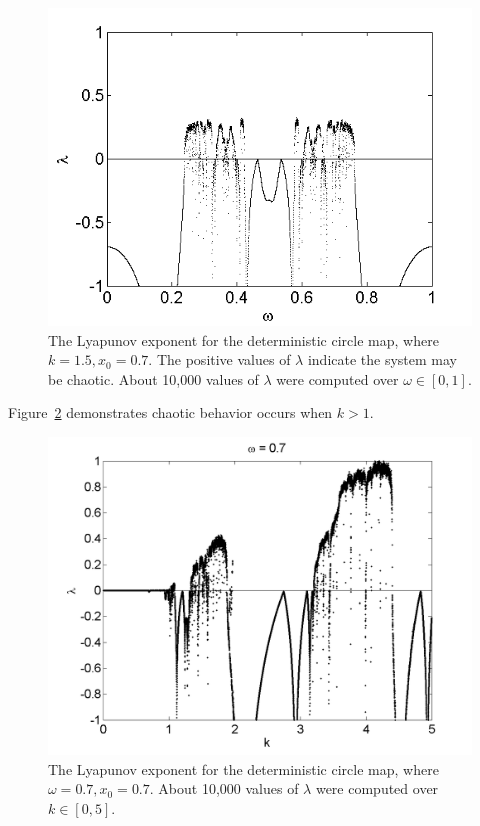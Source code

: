 \begin{figure}[!h]
\caption[Lyapunov exponent in the deterministic circle map, varying $\omega$]{The
  Lyapunov exponent for the deterministic
  circle map, where $k=1.5,x_0=0.7$. The positive values of $\lambda$
  indicate the system may be chaotic. About 10,000 values of $\lambda$
were computed over $\omega \in [0,1]$.}\label{fig:detcirclyap}
	\begin{center}%
		\includegraphics[scale=0.7]{figs/det_circ_lyap.png}
	\end{center}
\end{figure} 
Figure~\ref{fig:detcirclyapk} demonstrates chaotic behavior occurs
when $k > 1$.
\begin{figure}[!h]
\caption[Lyapunov exponent in the deterministic circle map, varying $k$]{The
  Lyapunov exponent for the deterministic
  circle map, where $\omega=0.7,x_0=0.7$. About 10,000 values of $\lambda$
were computed over $k \in [0,5]$.}\label{fig:detcirclyapk}
	\begin{center}
		\includegraphics[scale=0.45]{figs/det_circ_lyap_k.png}
	\end{center}
\end{figure} 

